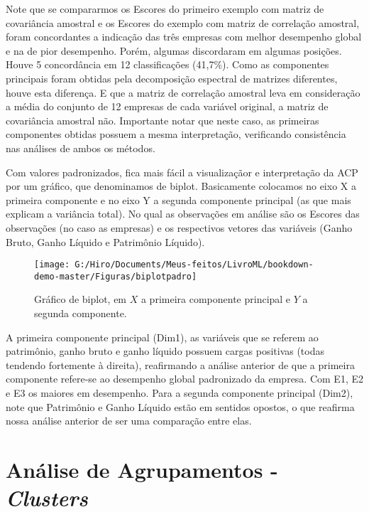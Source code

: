 \documentclass[
  openany]{book}
\begin{document}
Note que se compararmos os Escores do primeiro exemplo com matriz de covariância amostral e os Escores do exemplo com matriz de correlação amostral, foram concordantes a indicação das três empresas com melhor desempenho global e na de pior desempenho. Porém, algumas discordaram em algumas posições. Houve 5 concordância em 12 classificações (41,7\%). Como as componentes principais foram obtidas pela decomposição espectral de matrizes diferentes, houve esta diferença. E que a matriz de correlação amostral leva em consideração a média do conjunto de 12 empresas de cada variável original, a matriz de covariância amostral não. Importante notar que neste caso, as primeiras componentes obtidas possuem a mesma interpretação, verificando consistência nas análises de ambos os métodos.

Com valores padronizados, fica mais fácil a visualizaçãor e interpretação da ACP por um gráfico, que denominamos de biplot. Basicamente colocamos no eixo X a primeira componente e no eixo Y a segunda componente principal (as que mais explicam a variância total). No qual as observações em análise são os Escores das observações (no caso as empresas) e os respectivos vetores das variáveis (Ganho Bruto, Ganho Líquido e Patrimônio Líquido).

\begin{figure}

{\centering \texttt{[image: G:/Hiro/Documents/Meus-feitos/LivroML/bookdown-demo-master/Figuras/biplotpadro]} 

}

\caption{Gráfico de biplot, em \(X\) a primeira componente principal e \(Y\) a segunda componente.}\label{fig:biplotpadro}
\end{figure}



A primeira componente principal (Dim1), as variáveis que se referem ao patrimônio, ganho bruto e ganho líquido possuem cargas positivas (todas tendendo fortemente à direita), reafirmando a análise anterior de que a primeira componente refere-se ao desempenho global padronizado da empresa. Com E1, E2 e E3 os maiores em desempenho.
Para a segunda componente principal (Dim2), note que Patrimônio e Ganho Líquido estão em sentidos opostos, o que reafirma nossa análise anterior de ser uma comparação entre elas.

\hypertarget{anuxe1lise-de-agrupamentos---clusters}{%
\section{\texorpdfstring{Análise de Agrupamentos - \emph{Clusters}}{Análise de Agrupamentos - Clusters}}\label{anuxe1lise-de-agrupamentos---clusters}}
\end{document}
